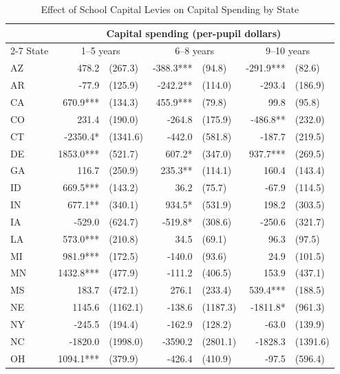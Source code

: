 \begin{table}[htbp]
    \centering
    \caption{Effect of School Capital Levies on Capital Spending by State}
    \label{tab:state_capital}
    \begin{threeparttable}
    \begin{tabular}{l*{3}{r@{\hspace{3pt}}l}}
    \toprule
    & \multicolumn{6}{c}{Capital spending (per-pupil dollars)} \\
    \cmidrule(lr){2-7}
    State & \multicolumn{2}{c}{1--5 years} & \multicolumn{2}{c}{6--8 years} & \multicolumn{2}{c}{9--10 years} \\
    \midrule
    AZ & 478.2 & (267.3) & -388.3*** & (94.8) & -291.9*** & (82.6) \\
    AR & -77.9 & (125.9) & -242.2** & (114.0) & -293.4 & (186.9) \\
    CA & 670.9*** & (134.3) & 455.9*** & (79.8) & 99.8 & (95.8) \\
    CO & 231.4 & (190.0) & -264.8 & (175.9) & -486.8** & (232.0) \\
    CT & -2350.4* & (1341.6) & -442.0 & (581.8) & -187.7 & (219.5) \\
    DE & 1853.0*** & (521.7) & 607.2* & (347.0) & 937.7*** & (269.5) \\
    GA & 116.7 & (250.9) & 235.3** & (114.1) & 160.4 & (143.4) \\
    ID & 669.5*** & (143.2) & 36.2 & (75.7) & -67.9 & (114.5) \\
    IN & 677.1** & (340.1) & 934.5* & (531.9) & 198.2 & (303.5) \\
    IA & -529.0 & (624.7) & -519.8* & (308.6) & -250.6 & (321.7) \\
    LA & 573.0*** & (210.8) & 34.5 & (69.1) & 96.3 & (97.5) \\
    MI & 981.9*** & (172.5) & -140.0 & (93.6) & 24.9 & (101.5) \\
    MN & 1432.8*** & (477.9) & -111.2 & (406.5) & 153.9 & (437.1) \\
    MS & 183.7 & (472.1) & 276.1 & (233.4) & 539.4*** & (188.5) \\
    NE & 1145.6 & (1162.1) & -138.6 & (1187.3) & -1811.8* & (961.3) \\
    NY & -245.5 & (194.4) & -162.9 & (128.2) & -63.0 & (139.9) \\
    NC & -1820.0 & (1998.0) & -3590.2 & (2801.1) & -1828.3 & (1391.6) \\
    OH & 1094.1*** & (379.9) & -426.4 & (410.9) & -97.5 & (596.4) \\

\end{tabular}
\end{threeparttable}
\end{table}

